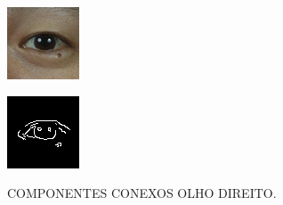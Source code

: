 \begin{figure}[h!]
    \caption{COMPONENTES CONEXOS OLHO DIREITO.}
    \centering
    \begin{minipage}[b]{0.45\textwidth}
        \centering
        \includegraphics[width=0.9\linewidth]{fig/02_detected_right_eye.png}
        \label{fig:olho}
    \end{minipage}
    \hfill
    \begin{minipage}[b]{0.45\textwidth}
        \centering
        \includegraphics[width=0.9\linewidth]{fig/03_right_eye_edge.png}
        \label{fig:canny-olho}
    \end{minipage}


\end{figure}
